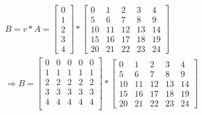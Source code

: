 \documentclass[../numerical_methods.tex]{subfiles}
\begin{document}
\begin{align*}
	 & B = v*A = \begin{bmatrix}
		             0 \\
		             1 \\
		             2 \\
		             3 \\
		             4
	             \end{bmatrix} * \begin{bmatrix}
		                             0  & 1  & 2  & 3  & 4  \\
		                             5  & 6  & 7  & 8  & 9  \\
		                             10 & 11 & 12 & 13 & 14 \\
		                             15 & 16 & 17 & 18 & 19 \\
		                             20 & 21 & 22 & 23 & 24
	                             \end{bmatrix}       \\
	 & \Rightarrow B = \begin{bmatrix}
		                   0 & 0 & 0 & 0 & 0 \\
		                   1 & 1 & 1 & 1 & 1 \\
		                   2 & 2 & 2 & 2 & 2 \\
		                   3 & 3 & 3 & 3 & 3 \\
		                   4 & 4 & 4 & 4 & 4 \\
	                   \end{bmatrix} * \begin{bmatrix}
		                                   0  & 1  & 2  & 3  & 4  \\
		                                   5  & 6  & 7  & 8  & 9  \\
		                                   10 & 11 & 12 & 13 & 14 \\
		                                   15 & 16 & 17 & 18 & 19 \\
		                                   20 & 21 & 22 & 23 & 24
	                                   \end{bmatrix}
\end{align*}
\end{document}
